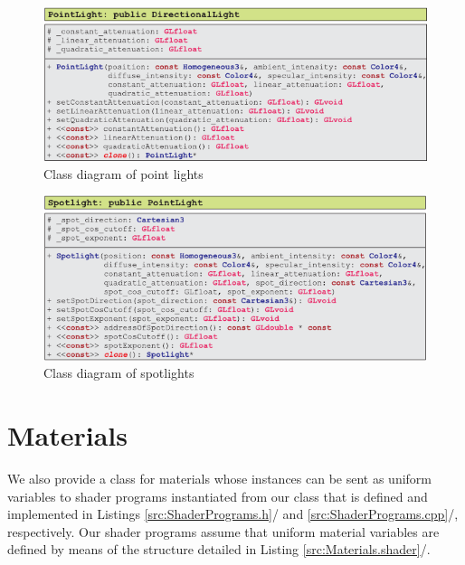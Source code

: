 \documentclass[b5paper, twosided]{book}
\newcommand{\CBlue}[1]{{\color[rgb]{0.0, 0.0, 0.9}{#1}}}
\DeclareRobustCommand{\mref}[1]{\ref{#1}{\relsize{-1}/\pageref{#1}}}
\begin{document}
\begin{figure}[!h]
    \centering
    \includegraphics[]{images/UMLPointLight.pdf}
    \caption{Class diagram of point lights}
    \label{fig:UMLPointLight}
\end{figure}

\begin{figure}[!h]
    \centering
    \includegraphics[]{images/UMLSpotlight.pdf}
    \caption{Class diagram of spotlights}
    \label{fig:UMLSpotlight}
\end{figure}


\newpage{}


\section{Materials}

We also provide a class for materials whose instances can be sent as uniform variables to shader programs instantiated from our class \CBlue{ShaderProgram} that is defined and implemented in Listings \mref{src:ShaderPrograms.h} and \mref{src:ShaderPrograms.cpp}, respectively. Our shader programs assume that uniform material variables are defined by means of the structure \CBlue{Material} detailed in Listing \mref{src:Materials.shader}.
\end{document}
